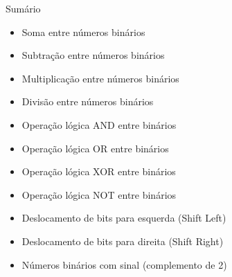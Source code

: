 
\begin{frame}{Sumário}
    \begin{itemize}
        \item Soma entre números binários
        \item Subtração entre números binários
        \item Multiplicação entre números binários
        \item Divisão entre números binários
        \item Operação lógica AND entre binários
        \item Operação lógica OR entre binários
        \item Operação lógica XOR entre binários
        \item Operação lógica NOT entre binários
        \item Deslocamento de bits para esquerda (Shift Left)
        \item Deslocamento de bits para direita (Shift Right)
        \item Números binários com sinal (complemento de 2)
    \end{itemize}
\end{frame}